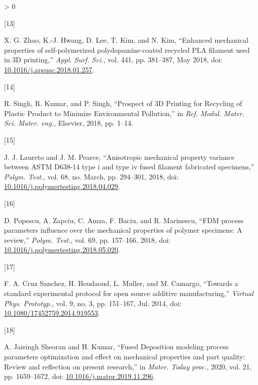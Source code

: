 \documentclass[conference,final,]{IEEEtran}
\newlength{\csllabelwidth}
\newlength{\cslhangindent}
\newenvironment{CSLReferences}[3] %
 {%
  \setlength{\parindent}{0pt}
  \ifodd #1 \everypar{\setlength{\hangindent}{\cslhangindent}}\ignorespaces\fi
  \ifnum #2 > 0
  \setlength{\parskip}{#2\baselineskip}
  \fi
 }%
 {}
\newcommand{\CSLLeftMargin}[1]{\parbox[t]{\csllabelwidth}{#1}}
\newcommand{\CSLRightInline}[1]{\parbox[t]{\linewidth - \csllabelwidth}{#1}}
\begin{document}
\begin{CSLReferences}{0}{0}
\leavevmode\hypertarget{ref-Zhao2018a}{}%
\CSLLeftMargin{{[}13{]} }
\CSLRightInline{X. G. Zhao, K.-J. Hwang, D. Lee, T. Kim, and N. Kim,
{``{Enhanced mechanical properties of self-polymerized
polydopamine-coated recycled PLA filament used in 3D printing},''}
\emph{Appl. Surf. Sci.}, vol. 441, pp. 381--387, May 2018, doi:
\href{https://doi.org/10.1016/j.apsusc.2018.01.257}{10.1016/j.apsusc.2018.01.257}.}

\leavevmode\hypertarget{ref-Singh2018e}{}%
\CSLLeftMargin{{[}14{]} }
\CSLRightInline{R. Singh, R. Kumar, and P. Singh, {``{Prospect of 3D
Printing for Recycling of Plastic Product to Minimize Environmental
Pollution},''} in \emph{Ref. Modul. Mater. Sci. Mater. eng.}, Elsevier,
2018, pp. 1--14.}

\leavevmode\hypertarget{ref-Laureto2018}{}%
\CSLLeftMargin{{[}15{]} }
\CSLRightInline{J. J. Laureto and J. M. Pearce, {``{Anisotropic
mechanical property variance between ASTM D638-14 type i and type iv
fused filament fabricated specimens},''} \emph{Polym. Test.}, vol. 68,
no. March, pp. 294--301, 2018, doi:
\href{https://doi.org/10.1016/j.polymertesting.2018.04.029}{10.1016/j.polymertesting.2018.04.029}.}

\leavevmode\hypertarget{ref-Popescu2018}{}%
\CSLLeftMargin{{[}16{]} }
\CSLRightInline{D. Popescu, A. Zapciu, C. Amza, F. Baciu, and R.
Marinescu, {``{FDM process parameters influence over the mechanical
properties of polymer specimens: A review},''} \emph{Polym. Test.}, vol.
69, pp. 157--166, 2018, doi:
\href{https://doi.org/10.1016/j.polymertesting.2018.05.020}{10.1016/j.polymertesting.2018.05.020}.}

\leavevmode\hypertarget{ref-CruzSanchez2014}{}%
\CSLLeftMargin{{[}17{]} }
\CSLRightInline{F. A. Cruz Sanchez, H. Boudaoud, L. Muller, and M.
Camargo, {``{Towards a standard experimental protocol for open source
additive manufacturing},''} \emph{Virtual Phys. Prototyp.}, vol. 9, no.
3, pp. 151--167, Jul. 2014, doi:
\href{https://doi.org/10.1080/17452759.2014.919553}{10.1080/17452759.2014.919553}.}

\leavevmode\hypertarget{ref-JaisinghSheoran2019}{}%
\CSLLeftMargin{{[}18{]} }
\CSLRightInline{A. Jaisingh Sheoran and H. Kumar, {``{Fused Deposition
modeling process parameters optimization and effect on mechanical
properties and part quality: Review and reflection on present
research},''} in \emph{Mater. Today proc.}, 2020, vol. 21, pp.
1659--1672, doi:
\href{https://doi.org/10.1016/j.matpr.2019.11.296}{10.1016/j.matpr.2019.11.296}.}


\end{CSLReferences}
\end{document}
